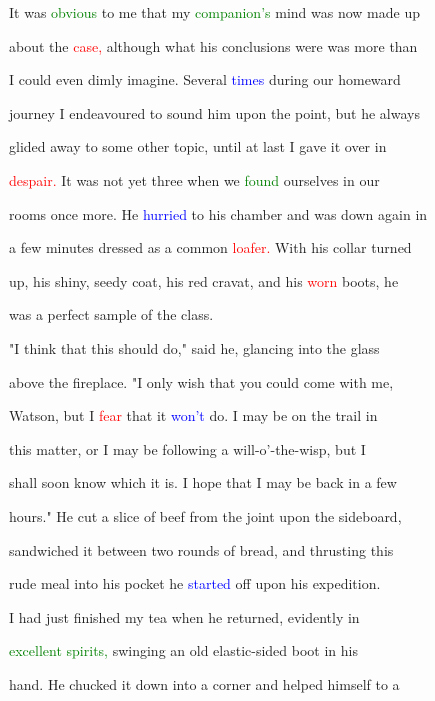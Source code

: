  It was \textcolor{green}{obvious} to me that my \textcolor{green}{companion's} mind was now made up

 about the \textcolor{red}{case,} although what his conclusions were was more than

 I could even dimly imagine. Several \textcolor{blue}{times} during our homeward

 \textcolor{BurntOrange}{journey} I endeavoured to sound him upon the point, but he always

 \textcolor{BurntOrange}{glided} away to some other topic, until at last I gave it over in

 \textcolor{red}{despair.} It was not yet three when we \textcolor{green}{found} ourselves in our

 rooms once more. He \textcolor{blue}{hurried} to his chamber and was down again in

 a few minutes dressed as a common \textcolor{red}{loafer.} With his collar turned

 up, his shiny, seedy coat, his red cravat, and his \textcolor{red}{worn} boots, he

 was a \textcolor{BurntOrange}{perfect} sample of the class.



 "I think that this should do," said he, glancing into the glass

 above the fireplace. "I only wish that you could come with me,

 Watson, but I \textcolor{red}{fear} that it \textcolor{blue}{won't} do. I may be on the trail in

 this matter, or I may be following a will-o'-the-wisp, but I

 shall soon know which it is. I \textcolor{BurntOrange}{hope} that I may be back in a few

 hours." He cut a slice of beef from the joint upon the sideboard,

 sandwiched it between two rounds of bread, and thrusting this

 rude meal into his pocket he \textcolor{blue}{started} off upon his \textcolor{BurntOrange}{expedition.}



 I had just finished my tea when he returned, evidently in

 \textcolor{green}{excellent} \textcolor{green}{spirits,} swinging an old elastic-sided boot in his

 hand. He chucked it down into a corner and helped himself to a

